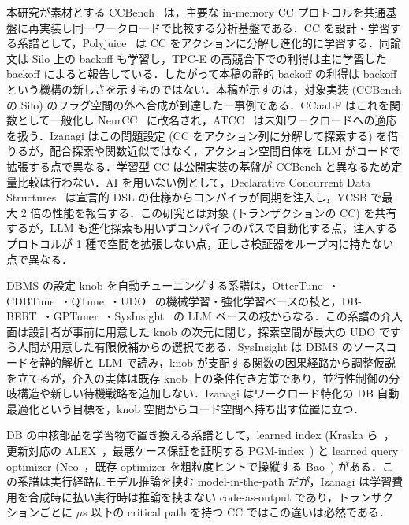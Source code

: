 \documentclass[submit,techrep,noauthor]{ipsj}
\begin{document}
本研究が素材とする CCBench~\cite{ccbench} は，主要な in-memory CC プロトコルを共通基盤に再実装し同一ワークロードで比較する分析基盤である．CC を設計・学習する系譜として，Polyjuice~\cite{polyjuice} は CC をアクションに分解し進化的に学習する．同論文は Silo 上の backoff も学習し，TPC-E の高競合下での利得は主に学習した backoff によると報告している．したがって本稿の静的 backoff の利得は backoff という機構の新しさを示すものではない．本稿が示すのは，対象実装 (CCBench の Silo) のフラグ空間の外へ合成が到達した一事例である．CCaaLF はこれを関数として一般化し NeurCC~\cite{neurcc} に改名され，ATCC~\cite{atcc} は未知ワークロードへの適応を扱う．Izanagi はこの問題設定 (CC をアクション列に分解して探索する) を借りるが，配合探索や関数近似ではなく，アクション空間自体を LLM がコードで拡張する点で異なる．学習型 CC は公開実装の基盤が CCBench と異なるため定量比較は行わない．AI を用いない例として，Declarative Concurrent Data Structures~\cite{dcds} は宣言的 DSL の仕様からコンパイラが同期を注入し，YCSB で最大 2 倍の性能を報告する．この研究とは対象 (トランザクションの CC) を共有するが，LLM も進化探索も用いずコンパイラのパスで自動化する点，注入するプロトコルが 1 種で空間を拡張しない点，正しさ検証器をループ内に持たない点で異なる．

DBMS の設定 knob を自動チューニングする系譜は，OtterTune~\cite{ottertune}・CDBTune~\cite{cdbtune}・QTune~\cite{qtune}・UDO~\cite{udo} の機械学習・強化学習ベースの枝と，DB-BERT~\cite{dbbert}・GPTuner~\cite{gptuner}・SysInsight~\cite{sysinsight} の LLM ベースの枝からなる．この系譜の介入面は設計者が事前に用意した knob の次元に閉じ，探索空間が最大の UDO ですら人間が用意した有限候補からの選択である．SysInsight は DBMS のソースコードを静的解析と LLM で読み，knob が支配する関数の因果経路から調整仮説を立てるが，介入の実体は既存 knob 上の条件付き方策であり，並行性制御の分岐構造や新しい待機戦略を追加しない．Izanagi はワークロード特化の DB 自動最適化という目標を，knob 空間からコード空間へ持ち出す位置に立つ．

DB の中核部品を学習物で置き換える系譜として，learned index (Kraska ら~\cite{learnedindex}，更新対応の ALEX~\cite{alex}，最悪ケース保証を証明する PGM-index~\cite{pgmindex}) と learned query optimizer (Neo~\cite{neo}，既存 optimizer を粗粒度ヒントで操縦する Bao~\cite{bao}) がある．この系譜は実行経路にモデル推論を挟む model-in-the-path だが，Izanagi は学習費用を合成時に払い実行時は推論を挟まない code-as-output であり，トランザクションごとに $\mu$s 以下の critical path を持つ CC ではこの違いは必然である．
\end{document}
